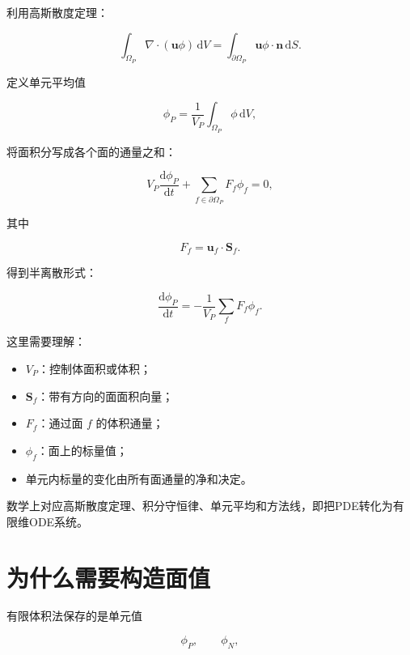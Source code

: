\documentclass[UTF8,12pt,a4paper,fontset=fandol]{ctexart}
\begin{document}
利用高斯散度定理：

\begin{equation}
\int_{\Omega_P}
\nabla\cdot(\bm u\phi)\,\mathrm dV
=
\int_{\partial\Omega_P}
\bm u\phi\cdot\bm n\,\mathrm dS.
\end{equation}

定义单元平均值

\begin{equation}
\phi_P
=
\frac{1}{V_P}
\int_{\Omega_P}\phi\,\mathrm dV,
\end{equation}

将面积分写成各个面的通量之和：

\begin{equation}
V_P\frac{\mathrm d\phi_P}{\mathrm dt}
+
\sum_{f\in\partial\Omega_P}
F_f\phi_f
=0,
\end{equation}

其中

\begin{equation}
F_f=\bm u_f\cdot\bm S_f.
\end{equation}

得到半离散形式：

\begin{equation}
\boxed{
\frac{\mathrm d\phi_P}{\mathrm dt}
=
-\frac{1}{V_P}
\sum_fF_f\phi_f
}.
\end{equation}

这里需要理解：

\begin{itemize}
  \item $V_P$：控制体面积或体积；
  \item $\bm S_f$：带有方向的面面积向量；
  \item $F_f$：通过面 $f$ 的体积通量；
  \item $\phi_f$：面上的标量值；
  \item 单元内标量的变化由所有面通量的净和决定。
\end{itemize}

数学上对应高斯散度定理、积分守恒律、单元平均和方法线，即把PDE转化为有限维ODE系统。

\section{为什么需要构造面值}

有限体积法保存的是单元值

\begin{equation}
\phi_P,\qquad\phi_N,
\end{equation}
\end{document}
